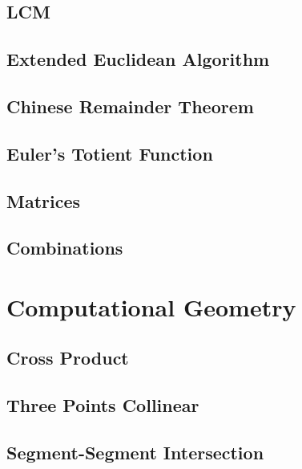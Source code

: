 \documentclass[11pt, letterpaper]{article}
\begin{document}
\subsection{LCM}


\subsection{Extended Euclidean Algorithm}


\subsection{Chinese Remainder Theorem}


\subsection{Euler's Totient Function}


\subsection{Matrices}


\subsection{Combinations}


\section{Computational Geometry}

\subsection{Cross Product}


\subsection{Three Points Collinear}


\subsection{Segment-Segment Intersection}

\end{document}

